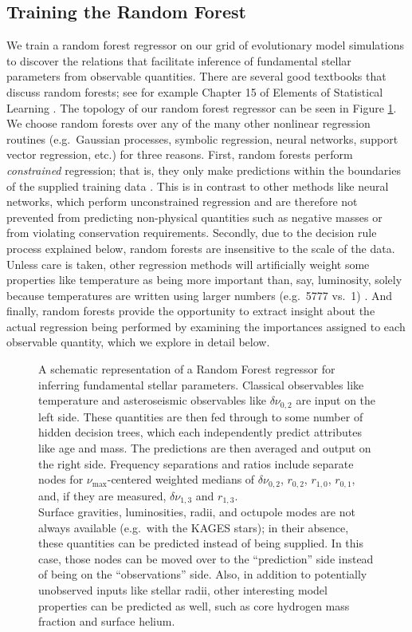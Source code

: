 \documentclass[manuscript]{aastex}
\begin{document}
\subsection{Training the Random Forest} \label{sec:forest}
We train a random forest regressor on our grid of evolutionary model simulations to discover the relations that facilitate inference of fundamental stellar parameters from observable quantities. There are several good textbooks that discuss random forests; see for example Chapter 15 of Elements of Statistical Learning \citep{hastie2005elements}. The topology of our random forest regressor can be seen in Figure \ref{fig:rf}. We choose random forests over any of the many other nonlinear regression routines (e.g.~Gaussian processes, symbolic regression, neural networks, support vector regression, etc.) for three reasons. First, random forests perform \emph{constrained} regression; that is, they only make predictions within the boundaries of the supplied training data \citep[see e.g.~section 9.2.1 of][]{hastie2005elements}. This is in contrast to other methods like neural networks, which perform unconstrained regression and are therefore not prevented from predicting non-physical quantities such as negative masses or from violating conservation requirements. Secondly, due to the decision rule process explained below, random forests are insensitive to the scale of the data. Unless care is taken, other regression methods will artificially weight some properties like temperature as being more important than, say, luminosity, solely because temperatures are written using larger numbers (e.g.~5777 vs.~1) \citep[see e.g.~section 11.5.3 of][]{hastie2005elements}. And finally, random forests provide the opportunity to extract insight about the actual regression being performed by examining the importances assigned to each observable quantity, which we explore in detail below. 

\begin{figure}
    \centering
    
    \caption{A schematic representation of a Random Forest regressor for inferring fundamental stellar parameters. Classical observables like temperature and asteroseismic observables like $\delta\nu_{0,2}$ are input on the left side. These quantities are then fed through to some number of hidden decision trees, which each independently predict attributes like age and mass. The predictions are then averaged and output on the right side. Frequency separations and ratios include separate nodes for $\nu_{\max}$-centered weighted medians of $\delta\nu_{0,2}$, $r_{0,2}$, $r_{1,0}$, $r_{0,1}$, and, if they are measured, $\delta\nu_{1,3}$ and $r_{1,3}$.\\
    Surface gravities, luminosities, radii, and octupole modes are not always available (e.g.~with the KAGES stars); in their absence, these quantities can be predicted instead of being supplied. In this case, those nodes can be moved over to the ``prediction'' side instead of being on the ``observations'' side. Also, in addition to potentially unobserved inputs like stellar radii, other interesting model properties can be predicted as well, such as core hydrogen mass fraction and surface helium. }
    \label{fig:rf}
\end{figure}
\end{document}
